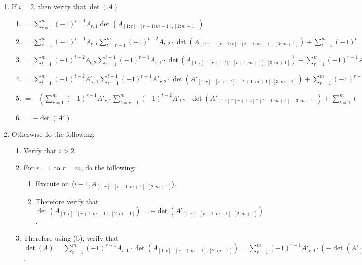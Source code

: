 \documentclass[twocolumn]{article}
\newcommand{\procedurehr}[2][]{\hyperref[sec:procedure #2]{\ifthenelse{\equal{#1}{}}{procedure #2}{#1}}}
\begin{document}
				\begin{enumerate}
					\item If $i=2$, then verify that $\det(A)$
					\begin{enumerate}
						\item $=\sum_{r=1}^m (-1)^{r-1}A_{r,1}\det(A_{[1:r]^\frown[r+1:m+1],[2:m+1]})$
						\item $=\sum_{r=1}^m (-1)^{r-1}A_{r,1}\sum_{t=r+1}^m (-1)^{t-2}A_{t,2}\cdot\det(A_{[1:r]^\frown[r+1:t]^\frown[t+1:m+1],[3:m+1]})+\sum_{t=1}^m (-1)^{t-1}A_{t,1}\sum_{r=1}^{t-1} (-1)^{r-1}A_{r,2}\cdot\det(A_{[1:r]^\frown[r+1:t]^\frown[t+1:m+1],[3:m+1]})$
						\item $=\sum_{t=1}^m (-1)^{t-2}A_{t,2}\sum_{r=1}^{t-1} (-1)^{r-1}A_{r,1}\cdot\det(A_{[1:r]^\frown[r+1:t]^\frown[t+1:m+1],[3:m+1]})+\sum_{r=1}^m (-1)^{r-1}A_{r,2}\sum_{t=r+1}^m (-1)^{t-1}A_{t,1}\cdot\det(A_{[1:r]^\frown[r+1:t]^\frown[t+1:m+1],[3:m+1]})$
						\item $=\sum_{t=1}^m (-1)^{t-2}A'_{t,1}\sum_{r=1}^{t-1} (-1)^{r-1}A'_{r,2}\cdot\det(A'_{[1:r]^\frown[r+1:t]^\frown[t+1:m+1],[3:m+1]})+\sum_{r=1}^m (-1)^{r-1}A'_{r,1}\sum_{t=r+1}^m (-1)^{t-1}A'_{t,2}\cdot\det(A'_{[1:r]^\frown[r+1:t]^\frown[t+1:m+1],[3:m+1]})$
						\item $=-(\sum_{r=1}^m (-1)^{r-1}A'_{r,1}\sum_{t=r+1}^m (-1)^{t-2}A'_{t,2}\cdot\det(A'_{[1:r]^\frown[r+1:t]^\frown[t+1:m+1],[3:m+1]})+\sum_{t=1}^m (-1)^{t-1}A'_{t,1}\sum_{r=1}^{t-1} (-1)^{r-1}A'_{r,2}\cdot\det(A'_{[1:r]^\frown[r+1:t]^\frown[t+1:m+1],[3:m+1]}))$
						\item $=-\det(A')$.
					\end{enumerate}
					\item Otherwise do the following:
					\begin{enumerate}
						\item Verify that $i>2$.
						\item For $r=1$ to $r=m$, do the following:
						\begin{enumerate}
							\item Execute \procedurehr{3.12} on $\langle i-1,\allowbreak A_{[1:r]^\frown[r+1:m+1],[2:m+1]}\rangle$.
							\item Therefore verify that $\det(A_{[1:r]^\frown[r+1:m+1],[2:m+1]})=-\det(A'_{[1:r]^\frown[r+1:m+1],[2:m+1]})$.
						\end{enumerate}
						\item Therefore using (b), verify that $\det(A)=\sum_{r=1}^m (-1)^{r-1}A_{r,1}\cdot\det(A_{[1:r]^\frown[r+1:m+1],[2:m+1]})=\sum_{r=1}^m (-1)^{r-1}A'_{r,1}\cdot(-\det(A'_{[1:r]^\frown[r+1:m+1],[2:m+1]}))=-\det(A')$.
					\end{enumerate}
				\end{enumerate}
\end{document}
